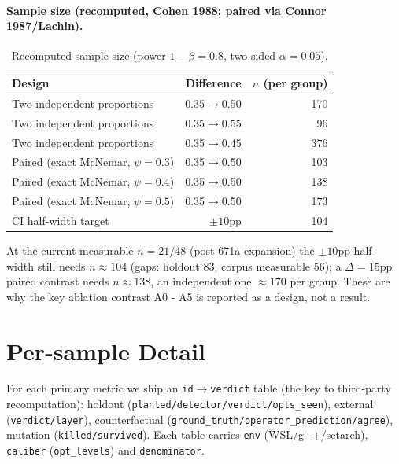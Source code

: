 \documentclass{article}
\begin{document}
\paragraph{Sample size (recomputed, Cohen 1988; paired via Connor 1987/Lachin).}
\begin{table}[h]
\caption{Recomputed sample size (power $1-\beta=0.8$, two-sided $\alpha=0.05$).}
\label{tab:samplesize}
\centering
\small
\begin{tabular}{@{}lrr@{}}
\toprule
Design & Difference & $n$ (per group) \\
\midrule
Two independent proportions & 0.35$\to$0.50 & 170 \\
Two independent proportions & 0.35$\to$0.55 & 96 \\
Two independent proportions & 0.35$\to$0.45 & 376 \\
Paired (exact McNemar, $\psi{=}0.3$) & 0.35$\to$0.50 & 103 \\
Paired (exact McNemar, $\psi{=}0.4$) & 0.35$\to$0.50 & 138 \\
Paired (exact McNemar, $\psi{=}0.5$) & 0.35$\to$0.50 & 173 \\
\midrule
CI half-width target & $\pm10$pp & 104 \\
\bottomrule
\end{tabular}
\end{table}
At the current measurable $n=21/48$ (post-671a expansion) the $\pm10$pp half-width still needs
$n\approx104$ (gaps: holdout 83, corpus measurable 56); a $\Delta=15$pp paired contrast needs
$n\approx138$, an independent one $\approx170$ per group. These are why the key ablation contrast
A0 - A5 is reported as a design, not a result.

\section{Per-sample Detail}
\label{app:persample}
For each primary metric we ship an \texttt{id}$\to$\texttt{verdict} table (the key to third-party
recomputation): holdout (\texttt{planted/detector/verdict/opts\_seen}), external
(\texttt{verdict/layer}), counterfactual (\texttt{ground\_truth/operator\_prediction/agree}),
mutation (\texttt{killed/survived}). Each table carries \texttt{env} (WSL/g++/setarch),
\texttt{caliber} (\texttt{opt\_levels}) and \texttt{denominator}.
\end{document}
